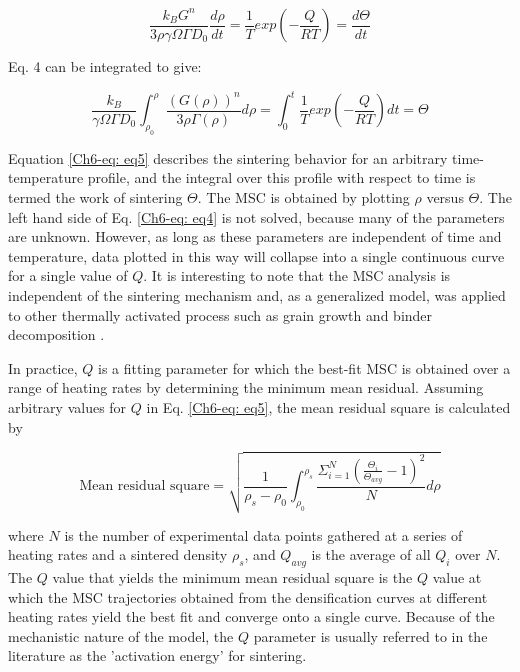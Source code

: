 \begin{equation}
\label{Ch6-eq: eq4}
\frac{k_{B} G^{n}}{3 \rho \gamma \Omega \Gamma D_{0}} \frac{d\rho}{dt} = \frac{1}{T} exp \left( -\frac{Q}{RT} \right) = \frac{d \Theta}{dt}
\end{equation}

\noindent Eq. 4 can be integrated to give:

\begin{equation}
\label{Ch6-eq: eq5}
\frac{k_{B} }{ \gamma \Omega \Gamma D_{0}} \int_{\rho_{0}}^{\rho} \frac{(G(\rho))^{n}}{3 \rho \Gamma (\rho)} d \rho = \int_{0}^{t} \frac{1}{T} exp \left( -\frac{Q}{RT} \right) dt = \Theta
\end{equation}

\noindent Equation \ref{Ch6-eq: eq5} describes the sintering behavior for an arbitrary time-temperature profile, and the integral over this profile with respect to time is termed the work of sintering $\Theta$. The MSC is obtained by plotting $\rho$ versus $\Theta$. The left hand side of Eq. \ref{Ch6-eq: eq4} is not solved, because many of the parameters are unknown. However, as long as these parameters are independent of time and temperature, data plotted in this way will collapse into a single continuous curve for a single value of $Q$. It is interesting to note that the MSC analysis is independent of the sintering mechanism and, as a generalized model, was applied to other thermally activated process such as grain growth \cite{Park2006} and binder decomposition \cite{Diantonio2005,Aggarwal2007}.

In practice, $Q$ is a fitting parameter for which the best-fit MSC is obtained over a range of heating rates by determining the minimum mean residual. Assuming arbitrary values for $Q$ in Eq. \ref{Ch6-eq: eq5}, the mean residual square is calculated by \cite{Blaine2006}

\begin{equation}
\label{Ch6-eq: eq6}
\mbox{Mean residual square} = \sqrt{\frac{1}{\rho_{s}-\rho_{0}}\int_{\rho_{0}}^{\rho_{s}} \frac{\Sigma_{i=1}^{N} \left( \frac{\Theta_{i}}{\Theta_{avg}}-1 \right)^{2}}{N} d\rho}
\end{equation}

\noindent where $N$ is the number of experimental data points gathered at a series of heating rates and a sintered density $\rho_{s}$, and $Q_{avg}$ is the average of all $Q_{i}$ over $N$. The $Q$ value that yields the minimum mean residual square is the $Q$ value at which the MSC trajectories obtained from the densification curves at different heating rates yield the best fit and converge onto a single curve.  Because of the mechanistic nature of the model, the $Q$ parameter is usually referred to in the literature as the 'activation energy' for sintering.

